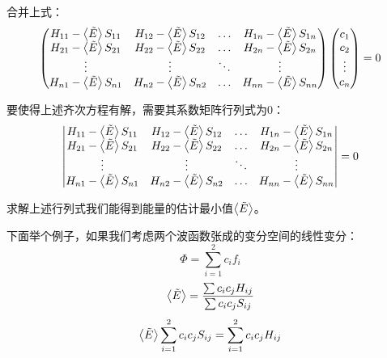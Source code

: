 合并上式：
\[
\begin{pmatrix}
H_{11}-\expval{\tilde{E}}S_{11} & H_{12}-\expval{\tilde{E}}S_{12} & \ldots & H_{1n}-\expval{\tilde{E}}S_{1n}\\
H_{21}-\expval{\tilde{E}}S_{21} & H_{22}-\expval{\tilde{E}}S_{22} & \ldots & H_{2n}-\expval{\tilde{E}}S_{2n}\\
\vdots & \vdots & \ddots & \vdots\\
H_{n1}-\expval{\tilde{E}}S_{n1} & H_{n2}-\expval{\tilde{E}}S_{n2} & \ldots & H_{nn}-\expval{\tilde{E}}S_{nn}\\
\end{pmatrix}
\begin{pmatrix}
c_1\\
c_2\\
\vdots\\
c_n\\
\end{pmatrix}
=0
\]

要使得上述齐次方程有解，需要其系数矩阵行列式为0：
\[
    \begin{vmatrix}
        H_{11}-\expval{\tilde{E}}S_{11} & H_{12}-\expval{\tilde{E}}S_{12} & \ldots & H_{1n}-\expval{\tilde{E}}S_{1n}\\
        H_{21}-\expval{\tilde{E}}S_{21} & H_{22}-\expval{\tilde{E}}S_{22} & \ldots & H_{2n}-\expval{\tilde{E}}S_{2n}\\
        \vdots & \vdots & \ddots & \vdots\\
        H_{n1}-\expval{\tilde{E}}S_{n1} & H_{n2}-\expval{\tilde{E}}S_{n2} & \ldots & H_{nn}-\expval{\tilde{E}}S_{nn}\\
    \end{vmatrix}
    =0
\]

求解上述行列式我们能得到能量的估计最小值$\expval{\tilde{E}}$。

下面举个例子，如果我们考虑两个波函数张成的变分空间的线性变分：
\[\varPhi=\sum_{i=1}^2c_if_i\]
\[\expval{\tilde{E}}=\frac{\sum c_ic_jH_{ij}}{\sum c_ic_jS_{ij}}\]
\[\expval{\tilde{E}}\sum_{i=1}^2 c_ic_jS_{ij}=\sum_{i=1}^2 c_ic_jH_{ij}\]

